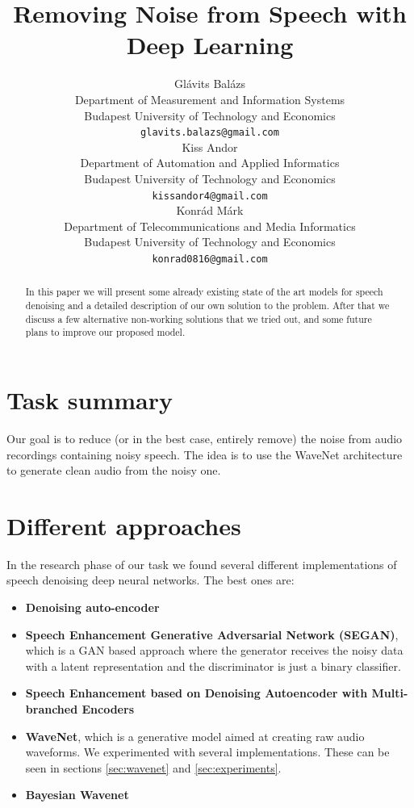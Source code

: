 \documentclass{article}
\title{Removing Noise from Speech with Deep Learning}
\author{
	Glávits Balázs \\
	Department of Measurement and Information Systems\\
	Budapest University of Technology and Economics\\
	\texttt{glavits.balazs@gmail.com} \\
	 \And
	Kiss Andor \\
	Department of Automation and Applied Informatics\\
	Budapest University of Technology and Economics\\
	\texttt{kissandor4@gmail.com} \\	 
	 \And
	Konrád Márk \\
	Department of Telecommunications and Media Informatics\\
	Budapest University of Technology and Economics\\
	\texttt{konrad0816@gmail.com} \\
}
\begin{document}
	
	\maketitle
	
	\begin{abstract}
	In this paper we will present some already existing state of the art models for speech denoising and a detailed description of our own solution to the problem.  After that we discuss a few alternative non-working solutions that we tried out, and some future plans to improve our proposed model.

	\end{abstract}
	\newpage
	\section{Task summary}
	\label{sec:summary}
		Our goal is to reduce (or in the best case, entirely remove) the noise from audio recordings containing noisy speech. The idea is to use the WaveNet\cite{wavenet} architecture to generate clean audio from the noisy one.
		
	\section{Different approaches}
	In the research phase of our task we found several different implementations of speech denoising deep neural networks. The best ones are:
	\begin{itemize}
		\item \textbf {Denoising auto-encoder}\cite{denoising_ae}\cite{denoising_ae2}
		\item \textbf{Speech Enhancement Generative Adversarial Network (SEGAN)}\cite{pascual2017segan}, which is a GAN based approach where the generator receives the noisy data with a latent representation and the discriminator is just a binary classifier.
		\item \textbf{Speech Enhancement based on Denoising Autoencoder with Multi-branched Encoders
		}\cite{yu2020speech}
		\item \textbf{WaveNet}\cite{wavenet}, which is a generative model aimed at creating raw audio waveforms. We experimented with several implementations. These can be seen in sections \ref{sec:wavenet} and \ref{sec:experiments}.
		\item \textbf{Bayesian Wavenet} \cite{bayesian}
	\end{itemize}
\end{document}
